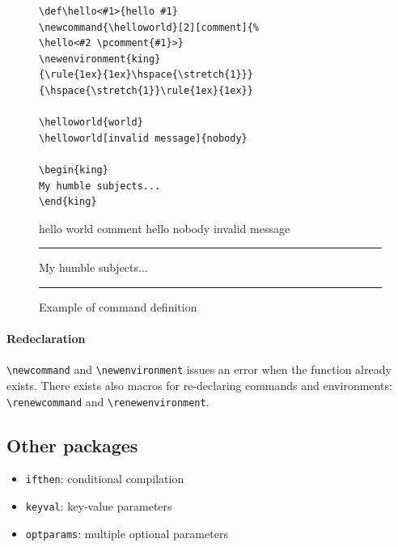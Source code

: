 \begin{figure}[H]
\centering
\begin{minipage}{0.5\linewidth}
\begin{lstlisting}[basicstyle=\scriptsize\ttfamily]
\def\hello<#1>{hello #1}
\newcommand{\helloworld}[2][comment]{%
\hello<#2 \pcomment{#1}>}
\newenvironment{king}
{\rule{1ex}{1ex}\hspace{\stretch{1}}}
{\hspace{\stretch{1}}\rule{1ex}{1ex}}

\helloworld{world}
\helloworld[invalid message]{nobody}

\begin{king}
My humble subjects...
\end{king}
\end{lstlisting}
\end{minipage}
\begin{minipage}{0.4\linewidth}
\def\hello<#1>{hello #1}
\newcommand{\helloworld}[2][comment]{%
\hello<#2 \pcomment{#1}>}
\newenvironment{king}
{\rule{1ex}{1ex}\hspace{\stretch{1}}}
{\hspace{\stretch{1}}\rule{1ex}{1ex}}

\helloworld{world}
\helloworld[invalid message]{nobody}

\begin{king}
My humble subjects...
\end{king}
\end{minipage}
\caption{Example of command definition}
\end{figure}

\paragraph{Redeclaration}
\lstinline$\newcommand$ and \lstinline$\newenvironment$ issues an error when the
function already exists.
There exists also macros for re-declaring commands and environments:
\lstinline$\renewcommand$ and \lstinline$\renewenvironment$.

\subsection*{Other packages}
\begin{itemize}
\item \texttt{ifthen}: conditional compilation
\item \texttt{keyval}: key-value parameters
\item \texttt{optparams}: multiple optional parameters
\end{itemize}

